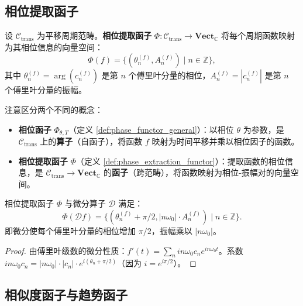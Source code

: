 \subsection{相位提取函子}

\begin{definition}[相位提取函子]\label{def:phase_extraction_functor}
设 $\mathcal{C}_{\text{trans}}$ 为平移周期范畴。\textbf{相位提取函子} $\Phi: \mathcal{C}_{\text{trans}} \to \mathbf{Vect}_{\mathbb{C}}$ 将每个周期函数映射为其相位信息的向量空间：
\[
\Phi(f) = \{(\theta_n^{(f)}, A_n^{(f)}) \mid n \in \mathbb{Z}\},
\]
其中 $\theta_n^{(f)} = \arg(c_n^{(f)})$ 是第 $n$ 个傅里叶分量的相位，$A_n^{(f)} = |c_n^{(f)}|$ 是第 $n$ 个傅里叶分量的振幅。
\end{definition}

\begin{remark}[相位提取函子与相位函子的区别]\label{rem:phase_extraction_vs_phase_functor}
注意区分两个不同的概念：
\begin{itemize}
    \item \textbf{相位函子} $\Phi_{\theta, T}$（定义 \ref{def:phase_functor_general}）：以相位 $\theta$ 为参数，是 $\mathcal{C}_{\text{trans}}$ 上的\textbf{算子}（自函子），将函数 $f$ 映射为时间平移并乘以相位因子的函数。
    \item \textbf{相位提取函子} $\Phi$（定义 \ref{def:phase_extraction_functor}）：提取函数的相位信息，是 $\mathcal{C}_{\text{trans}} \to \mathbf{Vect}_{\mathbb{C}}$ 的\textbf{函子}（跨范畴），将函数映射为相位-振幅对的向量空间。
\end{itemize}
\end{remark}

\begin{proposition}[相位提取函子与微分算子的关系]\label{prop:phase_extraction_differential}
相位提取函子 $\Phi$ 与微分算子 $\mathcal{D}$ 满足：
\[
\Phi(\mathcal{D}f) = \{(\theta_n^{(f)} + \pi/2, |n\omega_0| \cdot A_n^{(f)}) \mid n \in \mathbb{Z}\}.
\]
即微分使每个傅里叶分量的相位增加 $\pi/2$，振幅乘以 $|n\omega_0|$。
\end{proposition}

\begin{proof}
由傅里叶级数的微分性质：$f'(t) = \sum_n i n \omega_0 c_n e^{i n \omega_0 t}$。系数 $i n \omega_0 c_n = |n\omega_0| \cdot |c_n| \cdot e^{i(\theta_n + \pi/2)}$（因为 $i = e^{i\pi/2}$）。
\end{proof}

\subsection{相似度函子与趋势函子}

